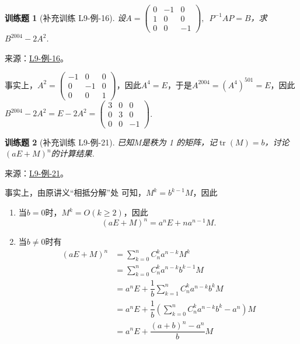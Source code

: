 \documentclass[UTF8,12pt,a4paper,fontset=fandol]{ctexart}
\newtheorem{exercise}{训练题}[section]
\begin{document}
\begin{exercise}[补充训练 L9-例-16]\label{prob:L9-例-16}
设$A=\begin{pmatrix}0 & -1 & 0 \\ 1 & 0 & 0 \\ 0 & 0 & -1 \end{pmatrix},\enspace P^{-1}AP=B$，求$B^{2004}-2A^2$.
\end{exercise}
\noindent 来源：\href{https://github.com/yhwu-is/Linear-Algebra-Left-Undone/blob/new/%E8%AE%B2%E4%B9%89/%E4%B8%93%E9%A2%98/9%20%E7%9F%A9%E9%98%B5%E8%BF%90%E7%AE%97%E8%BF%9B%E9%98%B6.tex}{L9-例-16}。
\begin{solve}
事实上，$A^2=\begin{pmatrix}
                      -1 & 0 & 0 \\ 0 & -1 & 0 \\ 0 & 0 & 1
                  \end{pmatrix}$，因此$A^4=E$，于是$A^{2004}=(A^4)^{501}=E$，因此$B^{2004}-2A^2=E-2A^2=\begin{pmatrix}
                      3 & 0 & 0 \\ 0 & 3  & 0 \\ 0 & 0 & -1
                  \end{pmatrix}$.
\end{solve}

\begin{exercise}[补充训练 L9-例-21]\label{prob:L9-例-21}
已知$M$是秩为 1 的矩阵，记$\operatorname{tr}(M)=b$，讨论$(aE+M)^n$的计算结果.
\end{exercise}
\noindent 来源：\href{https://github.com/yhwu-is/Linear-Algebra-Left-Undone/blob/new/%E8%AE%B2%E4%B9%89/%E4%B8%93%E9%A2%98/9%20%E7%9F%A9%E9%98%B5%E8%BF%90%E7%AE%97%E8%BF%9B%E9%98%B6.tex}{L9-例-21}。
\begin{solve}
事实上，由原讲义“相抵分解”处 可知，$M^k=b^{k-1}M$，因此
              \begin{enumerate}
                  \item 当$b=0$时，$M^k=O(k\geqslant 2)$，因此
                        \[(aE+M)^n=a^nE+na^{n-1}M.\]

                  \item 当$b\neq 0$时有
                        \begin{align*}
                            (aE+M)^n & =\sum\limits_{k=0}^nC_n^ka^{n-k}M^k                                    \\
                                     & =\sum\limits_{k=0}^nC_n^ka^{n-k}b^{k-1}M                               \\
                                     & =a^nE+\dfrac{1}{b}\sum\limits_{k=1}^nC_n^ka^{n-k}b^kM                  \\
                                     & =a^nE+\dfrac{1}{b}\left(\sum\limits_{k=0}^nC_n^ka^{n-k}b^k-a^n\right)M \\
                                     & =a^nE+\dfrac{(a+b)^n-a^n}{b}M
                        \end{align*}
              \end{enumerate}
\end{solve}
\end{document}
